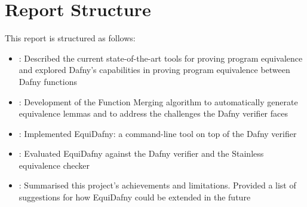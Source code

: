 \section{Report Structure}

This report is structured as follows:

\begin{itemize}
  \item {}: Described the current state-of-the-art tools for proving program equivalence and explored Dafny's capabilities in proving program equivalence between Dafny functions
  \item {}: Development of the Function Merging algorithm to automatically generate equivalence lemmas and to address the challenges the Dafny verifier faces 
  \item {}: Implemented EquiDafny: a command-line tool on top of the Dafny verifier
  \item {}: Evaluated EquiDafny against the Dafny verifier and the Stainless equivalence checker
  \item {}: Summarised this project's achievements and limitations. Provided a list of suggestions for how EquiDafny could be extended in the future
\end{itemize}